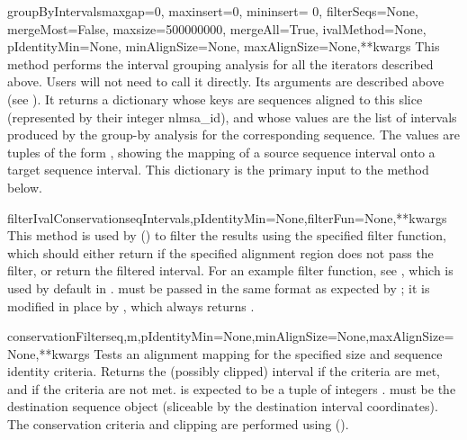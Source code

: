 \documentclass{howto}
\begin{document}
\begin{funcdesc}{groupByIntervals}{maxgap=0, maxinsert=0, mininsert= 0, filterSeqs=None, mergeMost=False, maxsize=500000000, mergeAll=True, ivalMethod=None, pIdentityMin=None, minAlignSize=None, maxAlignSize=None,**kwargs}
  This method performs the interval grouping analysis for all the iterators
  described above.  Users will not need to call it directly.  Its arguments
  are described above (see ).  It returns a dictionary
  whose keys are sequences aligned to this slice (represented by their integer nlmsa_id),
  and whose values are
  the list of intervals produced by the group-by analysis for the corresponding
  sequence.  The values are tuples of the form
  , showing the
  mapping of a source sequence interval onto a target sequence interval.
  This dictionary is the primary input to the 
  method below.
\end{funcdesc}

\begin{funcdesc}{filterIvalConservation}{seqIntervals,pIdentityMin=None,filterFun=None,**kwargs}
  This method is used by () to filter the results
  using the specified  filter function, which should either
  return  if the specified alignment region does not pass the filter,
  or return the filtered interval.  For an example
  filter function, see , which is used by default 
  in .   must be passed in
  the same format as expected by ; it is modified in
  place by , which always returns .
\end{funcdesc}

\begin{funcdesc}{conservationFilter}{seq,m,pIdentityMin=None,minAlignSize=None,maxAlignSize=None,**kwargs}
  Tests an alignment mapping  for the specified size and sequence 
  identity criteria.  Returns the (possibly clipped) interval  if
  the criteria are met, and  if the criteria are not met.  
  is expected to be a tuple of integers .
   must be the destination sequence object (sliceable by the destination
  interval coordinates).  The conservation criteria and clipping are performed
  using ().
\end{funcdesc}
\end{document}
